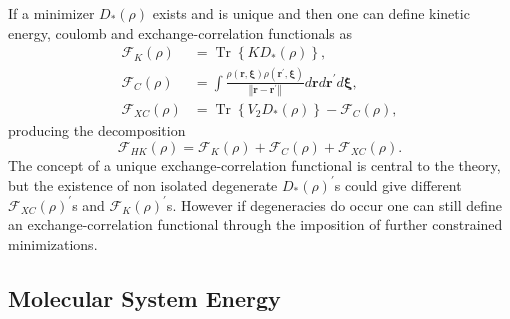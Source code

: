 \documentclass[aps,preprint]{revtex4}%
\begin{document}
If a minimizer $D_{\ast}\left(  \rho\right)  $ exists and is unique and then
one can define kinetic energy, coulomb and exchange-correlation functionals
as
\begin{align}
\mathcal{F}_{K}\left(  \rho\right)   &  =\operatorname{Tr}\left\{  KD_{\ast
}\left(  \rho\right)  \right\}  ,\nonumber\\
\mathcal{F}_{C}\left(  \rho\right)   &  =\int\frac{\rho\left(
\boldsymbol{r,\xi}\right)  \rho\left(  \boldsymbol{r}^{\prime}\boldsymbol{,\xi
}\right)  }{\left\Vert \boldsymbol{r-r}^{\prime}\right\Vert }d\boldsymbol{r}%
d\boldsymbol{r}^{\prime}d\boldsymbol{\xi},\nonumber\\
\mathcal{F}_{XC}\left(  \rho\right)   &  =\operatorname{Tr}\left\{
V_{2}D_{\ast}\left(  \rho\right)  \right\}  -\mathcal{F}_{C}\left(
\rho\right)  ,
\end{align}
producing the decomposition
\begin{equation}
\mathcal{F}_{HK}\left(  \rho\right)  =\mathcal{F}_{K}\left(  \rho\right)
+\mathcal{F}_{C}\left(  \rho\right)  +\mathcal{F}_{XC}\left(  \rho\right)  .
\end{equation}
The concept of a unique exchange-correlation functional is central to the
theory, but the existence of non isolated degenerate $D_{\ast}\left(
\rho\right)  ^{\prime}$s could give different $\mathcal{F}_{XC}\left(
\rho\right)  ^{\prime}$s and $\mathcal{F}_{K}\left(  \rho\right)  ^{\prime}$s.
However if degeneracies do occur one can still define an exchange-correlation
functional through the imposition of further constrained minimizations.

\subsection{Molecular System Energy\label{MolSysEn}}
\end{document}
